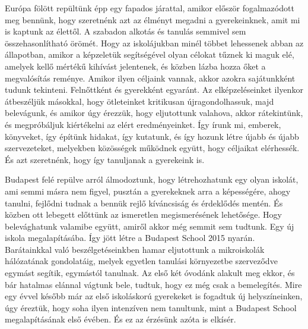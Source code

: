 Európa fölött repültünk épp egy fapados járattal, amikor először
fogalmazódott meg bennünk, hogy szeretnénk azt az élményt megadni a
gyerekeinknek, amit mi is kaptunk az élettől. A szabadon alkotás és
tanulás semmivel sem összehasonlítható örömét. Hogy az iskolájukban
minél többet lehessenek abban az állapotban, amikor a képzeletük
segítségével olyan célokat tűznek ki maguk elé, amelyek kellő mértékű
kihívást jelentenek, és közben lázba hozza őket a megvalósítás
reménye. Amikor ilyen céljaink vannak, akkor azokra sajátunkként
tudunk tekinteni. Felnőttként és gyerekként egyaránt. Az
elképzeléseinket ilyenkor átbeszéljük másokkal, hogy ötleteinket
kritikusan újragondolhassuk, majd belevágunk, és amikor úgy érezzük,
hogy eljutottunk valahova, akkor rátekintünk, és megpróbáljuk
kiértékelni az elért eredményeinket. Így írunk mi, emberek, könyveket,
így építünk hidakat, így kutatunk, és így hozunk létre újabb és újabb
szervezeteket, melyekben közösségek működnek együtt, hogy céljaikat
elérhessék. És azt szeretnénk, hogy így tanuljanak a gyerekeink is.


Budapest felé repülve arról álmodoztunk, hogy létrehozhatunk egy olyan
iskolát, ami semmi másra nem figyel, pusztán a gyerekeknek arra a
képességére, ahogy tanulni, fejlődni tudnak a bennük rejlő kíváncsiság
és érdeklődés mentén. És közben ott lebegett előttünk az ismeretlen
megismerésének lehetősége. Hogy belevághatunk valamibe együtt, amiről
akkor még semmit sem tudtunk. Egy új iskola megalapításába. Így jött
létre a Budapest School 2015 nyarán. Barátainkkal való
beszélgetéseinkben hamar eljutottunk a mikroiskolák hálózatának
gondolatáig, melyek egyetlen tanulási környezetbe szerveződve egymást
segítik, egymástól tanulnak. Az első két óvodánk alakult meg ekkor, és
bár hatalmas elánnal vágtunk bele, tudtuk, hogy ez még csak a
bemelegítés. Mire egy évvel később már az első iskoláskorú gyerekeket
is fogadtuk új helyszíneinken, úgy éreztük, hogy soha ilyen intenzíven
nem tanultunk, mint a Budapest School megalapításának első évében. És
ez az érzésünk azóta is elkísér.


